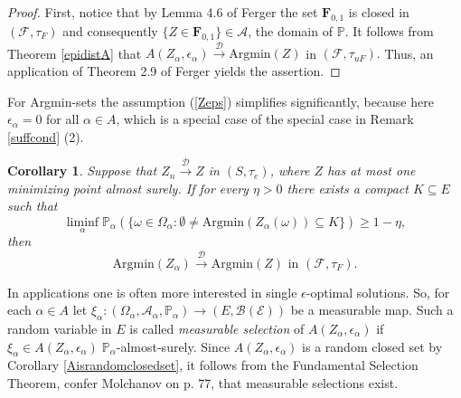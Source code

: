 \documentclass[sn-mathphys,Numbered]{sn-jnl}%
\theoremstyle{thmstyleone}%
\theoremstyle{thmstyletwo}%
\newtheorem{corollary}{Corollary}%
\theoremstyle{thmstylethree}%
\begin{document}
\begin{proof} First, notice that by Lemma 4.6 of Ferger \cite{Ferger2} the set $\textbf{F}_{0,1}$ is closed in $(\mathcal{F},\tau_F)$ and consequently $\{Z \in \textbf{F}_{0,1}\} \in \mathcal{A}$, the domain of $\mathbb{P}.$ It follows from Theorem \ref{epidistA} that $A(Z_\alpha,\epsilon_\alpha) \stackrel{\mathcal{D}}{\rightarrow} \text{Argmin}(Z)$ in $(\mathcal{F}, \tau_{uF}).$
Thus, an application of Theorem 2.9 of Ferger \cite{Ferger2} yields the assertion.
\end{proof}

For Argmin-sets the assumption (\ref{Zeps}) simplifies significantly, because here $\epsilon_\alpha =0$ for all $\alpha \in A$, which is
a special case of the special case in Remark \ref{suffcond} (2).\\

\begin{corollary} \label{Argminsets} Suppose that $Z_n \stackrel{\mathcal{D}}{\rightarrow} Z$ in $(S,\tau_e)$, where $Z$ has at most one minimizing point almost surely. If
for every $\eta>0$ there exists a compact $K \subseteq E$ such that
$$
 \liminf_\alpha \mathbb{P}_\alpha(\{\omega \in \Omega_\alpha: \emptyset \neq \text{Argmin}(Z_\alpha(\omega)) \subseteq K\}) \ge 1-\eta,
$$
then
$$\text{Argmin}(Z_\alpha) \stackrel{\mathcal{D}}{\rightarrow} \text{Argmin}(Z) \text{ in } (\mathcal{F}, \tau_{F}).$$
\end{corollary}

\vspace{0.4cm}
In applications one is often more interested in single $\epsilon$-optimal solutions. So, for each $\alpha \in A$ let $\xi_\alpha: (\Omega_\alpha,\mathcal{A}_\alpha,\mathbb{P}_\alpha) \rightarrow (E,\mathcal{B(E)})$ be a measurable map. Such a random variable in $E$ is called \emph{measurable selection} of $A(Z_\alpha,\epsilon_\alpha)$ if $\xi_\alpha \in A(Z_\alpha,\epsilon_\alpha) \;
\mathbb{P}_\alpha$-almost-surely. Since $A(Z_\alpha,\epsilon_\alpha)$ is a random closed set by Corollary \ref{Aisrandomclosedset}, it follows from the Fundamental Selection Theorem, confer Molchanov \cite{Molchanov} on p. 77,
that measurable selections exist.\\
\end{document}
